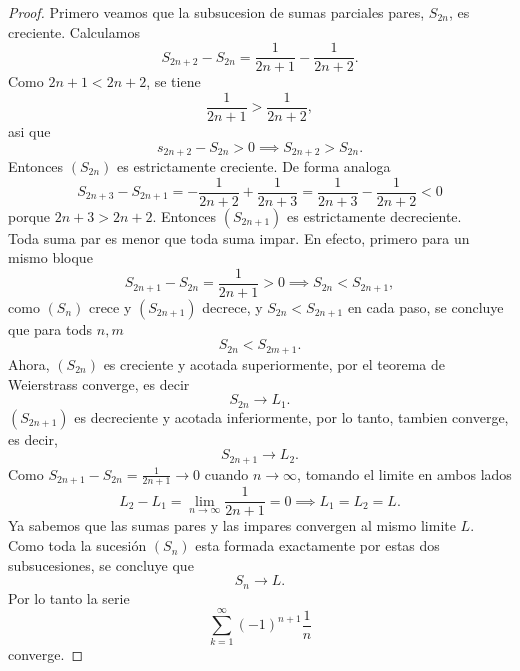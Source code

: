 \documentclass[12pt,a4paper]{article}
\begin{document}
    \begin{proof}
        Primero veamos que la subsucesion de sumas parciales pares, $S_{2n}$,
        es creciente. Calculamos
        \begin{equation*}
            S_{2n+2}-S_{2n}=\frac{1}{2n+1}-\frac{1}{2n+2}.
        \end{equation*}
        Como $2n+1\lt2n+2$, se tiene
        \begin{equation*}
            \frac{1}{2n+1}\gt\frac{1}{2n+2},
        \end{equation*}
        asi que
        \begin{equation*}
            s_{2n+2}-S_{2n}\gt0\implies S_{2n+2}\gt S_{2n}.
        \end{equation*}
        Entonces $(S_{2n})$ es estrictamente creciente. De forma analoga
        \begin{equation*}
            S_{2n+3}-S_{2n+1}=-\frac{1}{2n+2}+\frac{1}{2n+3}=\frac{1}{2n+3}-\frac{1}{2n+2}\lt0
        \end{equation*}
        porque $2n+3\gt 2n+2$. Entonces $(S_{2n+1})$ es estrictamente decreciente.\\
        Toda suma par es menor que toda suma impar. En efecto, primero para un mismo bloque
        \begin{equation*}
            S_{2n+1}-S_{2n}=\frac{1}{2n+1}\gt0\implies S_{2n}\lt S_{2n+1},
        \end{equation*} 
        como $(S_{n})$ crece y $(S_{2n+1})$ decrece, y $S_{2n}\lt S_{2n+1}$
        en cada paso, se concluye que para tods $n,m$
        \begin{equation*}
            S_{2n}\lt S_{2m+1}.
        \end{equation*}
        Ahora, $(S_{2n})$ es creciente y acotada superiormente, por el teorema de Weierstrass
        converge, es decir
        \begin{equation*}
            S_{2n}\to L_{1}.
        \end{equation*}
        $(S_{2n+1})$ es decreciente y acotada inferiormente, por lo tanto, tambien converge,
        es decir,
        \begin{equation*}
            S_{2n+1}\to L_{2}.
        \end{equation*}
        Como $S_{2n+1}-S_{2n}=\frac{1}{2n+1}\to0$ cuando $n\to\infty$,
        tomando el limite en ambos lados
        \begin{equation*}
            L_{2}-L_{1}=\lim_{n\to\infty}\frac{1}{2n+1}=0\implies L_{1}=L_{2}=L.
        \end{equation*}
        Ya sabemos que las sumas pares y las impares convergen al mismo limite $L$.
        Como toda la sucesión $(S_{n})$ esta formada exactamente por estas dos subsucesiones,
        se concluye que
        \begin{equation*}
            S_{n}\to L.
        \end{equation*}
        Por lo tanto la serie
        \begin{equation*}
            \sum_{k=1}^{\infty}(-1)^{n+1}\frac{1}{n}
        \end{equation*}
        converge.
    \end{proof}
\end{document}
